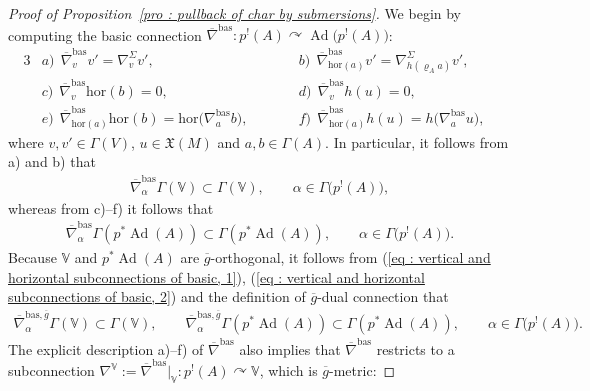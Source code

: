 \documentclass[pdftex]{sigma}
\numberwithin{equation}{section}
\newcommand{\acts}{\curvearrowright}
\newcommand{\8}{\infty}
\newcommand{\X}{\mathfrak{X}}
\begin{document}
\begin{proof}[Proof of Proposition~\ref{pro : pullback of char by submersions}]
 We begin by computing the basic connection $\overline{\nabla}^{\mathrm{bas}}\colon p^!(A) \acts \operatorname{Ad}\big(p^!(A)\big)$:
 \begin{alignat*}{3}
& a) \ \ \overline{\nabla}^{\mathrm{bas}}_vv'=\nabla^{\Sigma}_{v}v', \qquad && b) \ \ \overline{\nabla}^{\mathrm{bas}}_{\mathrm{hor}(a)}v'=\nabla^{\Sigma}_{h(\varrho_Aa)}v', & \\
& c) \ \ \overline{\nabla}^{\mathrm{bas}}_v\mathrm{hor}(b)=0, \qquad && d) \ \ \overline{\nabla}^{\mathrm{bas}}_vh(u)=0, & \\
& e) \ \ \overline{\nabla}^{\mathrm{bas}}_{\mathrm{hor}(a)}\mathrm{hor}(b)=\mathrm{hor}\big(\nabla^{\mathrm{bas}}_{a}b\big), \qquad && f) \ \
\overline{\nabla}^{\mathrm{bas}}_{\mathrm{hor}(a)}h(u)=h\big(\nabla^{\mathrm{bas}}_au\big), &
 \end{alignat*}where $v,v' \in \Gamma(V)$, $u \in \X(M)$ and $a,b \in \Gamma(A)$. In particular, it follows from a) and b) that
 \begin{gather}\label{eq : vertical and horizontal subconnections of basic, 1}
 \overline{\nabla}^{\mathrm{bas}}_{\alpha}\Gamma(\mathbb{V}) \subset \Gamma(\mathbb{V}), \qquad \alpha \in \Gamma\big(p^!(A)\big),
 \end{gather}whereas from c)--f) it follows that
 \begin{gather}\label{eq : vertical and horizontal subconnections of basic, 2}
 \overline{\nabla}^{\mathrm{bas}}_{\alpha}\Gamma(p^*\operatorname{Ad}(A)) \subset \Gamma(p^*\operatorname{Ad}(A)), \qquad \alpha \in \Gamma\big(p^!(A)\big).
 \end{gather}Because $\mathbb{V}$ and $p^*\operatorname{Ad}(A)$ are $\overline{g}$-orthogonal, it follows from (\ref{eq : vertical and horizontal subconnections of basic, 1}), (\ref{eq : vertical and horizontal subconnections of basic, 2}) and the definition of $\overline{g}$-dual connection that
 \begin{gather}\label{eq : vertical and horizontal subconnections of g-dual of basic}
 \overline{\nabla}^{\mathrm{bas},\overline{g}}_{\alpha}\Gamma(\mathbb{V}) \subset \Gamma(\mathbb{V}), \qquad \overline{\nabla}^{\mathrm{bas},\overline{g}}_{\alpha}\Gamma(p^*\operatorname{Ad}(A)) \subset \Gamma(p^*\operatorname{Ad}(A)), \qquad \alpha \in \Gamma\big(p^!(A)\big).
 \end{gather}
The explicit description a)--f) of $\overline{\nabla}^{\mathrm{bas}}$ also implies that $\overline{\nabla}^{\mathrm{bas}}$ restricts to a subconnection $\nabla^{\mathbb{V}}:=\overline{\nabla}^{\mathrm{bas}}|_{\mathbb{V}}\colon p^!(A) \acts \mathbb{V}$, which is $\overline{g}$-metric:

\end{proof}
\end{document}
